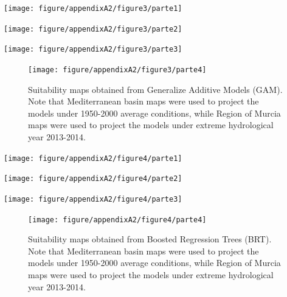 \documentclass[11pt,twoside]{reedthesis}
\begin{document}
\begin{landscape}
\begin{center}\texttt{[image: figure/appendixA2/figure3/parte1]} \end{center}

\begin{center}\texttt{[image: figure/appendixA2/figure3/parte2]} \end{center}

\begin{center}\texttt{[image: figure/appendixA2/figure3/parte3]} \end{center}
\setlength{\textfloatsep}{-10pt plus 1.0pt minus 2.0pt}

\setlength{\abovecaptionskip}{15pt}
\begin{figure}[hbt!]

{\centering \texttt{[image: figure/appendixA2/figure3/parte4]} 

}

\caption[Suitability maps obtained from Generalize Additive Models (GAM)]{Suitability maps obtained from Generalize Additive Models (GAM). Note that Mediterranean basin maps were used to project the models under 1950-2000 average conditions, while Region of Murcia maps were used to project the models under extreme hydrological year 2013-2014.}\label{fig:apa234}
\end{figure}
\setlength{\abovecaptionskip}{0pt}

\newpage
\end{landscape}
\newpage
\begin{landscape}
\begin{center}\texttt{[image: figure/appendixA2/figure4/parte1]} \end{center}

\begin{center}\texttt{[image: figure/appendixA2/figure4/parte2]} \end{center}

\begin{center}\texttt{[image: figure/appendixA2/figure4/parte3]} \end{center}
\setlength{\textfloatsep}{-10pt plus 1.0pt minus 2.0pt}

\setlength{\abovecaptionskip}{15pt}
\begin{figure}[hbt!]

{\centering \texttt{[image: figure/appendixA2/figure4/parte4]} 

}

\caption[Suitability maps obtained from Boosted Regression Trees (BRT)]{Suitability maps obtained from Boosted Regression Trees (BRT). Note that Mediterranean basin maps were used to project the models under 1950-2000 average conditions, while Region of Murcia maps were used to project the models under extreme hydrological year 2013-2014.}\label{fig:apa244}
\end{figure}
\setlength{\abovecaptionskip}{0pt}

\newpage
\end{landscape}
\end{document}
